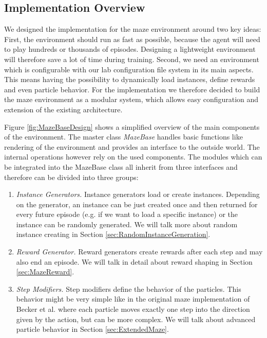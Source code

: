 \subsection{Implementation Overview} \label{sec:MazeImplementation}
We designed the implementation for the maze environment around two key ideas: First, the environment should run as fast as possible, because the agent will need to play hundreds or thousands of episodes. Designing a lightweight environment will therefore save a lot of time during training. Second, we need an environment which is configurable with our lab configuration file system in its main aspects. This means having the possibility to dynamically load instances, define rewards and even particle behavior. For the implementation we therefore decided to build the maze environment as a modular system, which allows easy configuration and extension of the existing architecture. 

Figure \ref{fig:MazeBaseDesign} shows a simplified overview of the main components of the environment. The master class \textit{MazeBase} handles basic functions like rendering of the environment and provides an interface to the outside world. The internal operations however rely on the used components. The modules which can be integrated into the MazeBase class all inherit from three interfaces and therefore can be divided into three groups:

\begin{enumerate}
    \item \textit{Instance Generators.} Instance generators load or create instances. Depending on the generator, an instance can be just created once and then returned for every future episode (e.g. if we want to load a specific instance) or the instance can be randomly generated. We will talk more about random instance creating in Section \ref{sec:RandomInstanceGeneration}.
    \item \textit{Reward Generator.} Reward generators create rewards after each step and may also end an episode. We will talk in detail about reward shaping in Section \ref{sec:MazeReward}.
    \item \textit{Step Modifiers.} Step modifiers define the behavior of the particles. This behavior might be very simple like in the original maze implementation of Becker et al. where each particle moves exactly one step into the direction given by the action, but can be more complex. We will talk about advanced particle behavior in Section \ref{sec:ExtendedMaze}. 
\end{enumerate}

